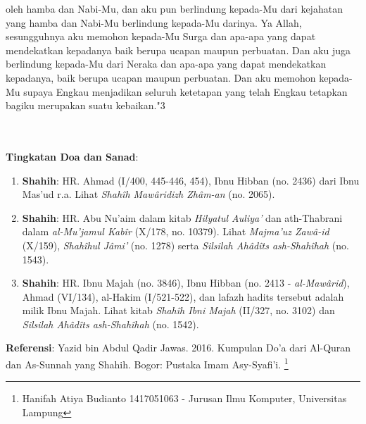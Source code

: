 \documentclass[a4paper,12pt]{article}
\begin{document}
oleh hamba dan Nabi-Mu, dan aku pun berlindung kepada-Mu dari kejahatan 
yang hamba dan Nabi-Mu berlindung kepada-Mu darinya. Ya Allah, sesungguhnya
aku memohon kepada-Mu Surga dan apa-apa yang dapat mendekatkan kepadanya 
baik berupa ucapan maupun perbuatan. Dan aku juga berlindung kepada-Mu dari
Neraka dan apa-apa yang dapat mendekatkan kepadanya, baik berupa ucapan 
maupun perbuatan. Dan aku memohon kepada-Mu supaya  Engkau menjadikan 
seluruh ketetapan yang telah Engkau tetapkan bagiku merupakan suatu 
kebaikan."{\scriptsize 3}\\\\\\
\par
\noindent
\textbf{Tingkatan Doa dan Sanad}:
\begin{enumerate}
\item \textbf{Shahih}: HR. Ahmad (I/400, 445-446, 454), Ibnu Hibban (no. 
2436) dari Ibnu Mas'ud r.a. Lihat \textit{Shah\^{i}h Maw\^{a}ridizh 
Zh\^{a}m-an} (no. 2065).
\item \textbf{Shahih}: HR. Abu Nu'aim dalam kitab \textit{Hilyatul Auliya'}
dan ath-Thabrani dalam \textit{al-Mu'jamul Kab\^{i}r} (X/178, no. 10379). 
Lihat \textit{Majma'uz Zaw\^{a}-id} (X/159), \textit{Shah\^{i}hul 
J\^{a}mi'} (no. 1278) serta \textit{Silsilah Ah\^{a}d\^{i}ts 
ash-Shah\^{i}hah} (no. 1543).
\item \textbf{Shahih}: HR. Ibnu Majah (no. 3846), Ibnu Hibban (no. 2413 - 
\textit{al-Maw\^{a}rid}), Ahmad (VI/134), al-Hakim (I/521-522), dan lafazh 
hadits tersebut adalah milik Ibnu Majah. Lihat kitab \textit{Shah\^{i}h 
Ibni Majah} (II/327, no. 3102) dan \textit{Silsilah Ah\^{a}d\^{i}ts 
ash-Shah\^{i}hah} (no. 1542).
\end{enumerate}
\textbf{Referensi}: Yazid bin Abdul Qadir Jawas. 2016. Kumpulan Do'a dari
Al-Quran dan As-Sunnah yang Shahih. Bogor: Pustaka Imam Asy-Syafi'i.
\footnote{Hanifah Atiya Budianto 1417051063 - Jurusan Ilmu Komputer,
Universitas Lampung}
\end{document}
